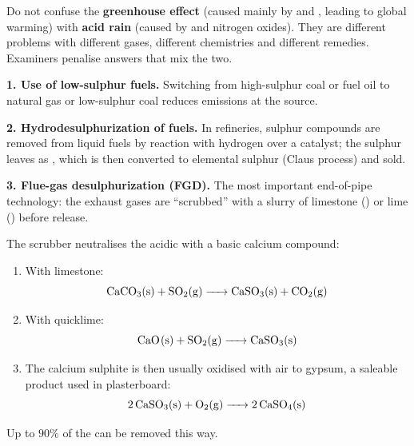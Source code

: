 \documentclass[11pt]{article}
\newcounter{popsec}
\newcounter{popsub}
\newcommand{\courssub}[1]{%
  \stepcounter{popsub}%
  \par\vspace{9pt}\noindent{\popxbold\fontsize{11.5}{13}\selectfont\color{popink}{\color{poporange}\thepopsec.\thepopsub}\hspace{6pt}#1}\par\nopagebreak\vspace{4pt}
}
\begin{document}
\begin{attention}
Do not confuse the \textbf{greenhouse effect} (caused mainly by  and , leading to global warming) with \textbf{acid rain} (caused by  and nitrogen oxides). They are different problems with different gases, different chemistries and different remedies. Examiners penalise answers that mix the two.
\end{attention}

\courssub{Control Measures}

\textbf{1. Use of low-sulphur fuels.} Switching from high-sulphur coal or fuel oil to natural gas or low-sulphur coal reduces emissions at the source.

\textbf{2. Hydrodesulphurization of fuels.} In refineries, sulphur compounds are removed from liquid fuels by reaction with hydrogen over a catalyst; the sulphur leaves as , which is then converted to elemental sulphur (Claus process) and sold.

\textbf{3. Flue-gas desulphurization (FGD).} The most important end-of-pipe technology: the exhaust gases are ``scrubbed'' with a slurry of limestone () or lime () before release.

\begin{methode}
The scrubber neutralises the acidic  with a basic calcium compound:
\begin{enumerate}
\item With limestone:
\[ \ce{CaCO3(s) + SO2(g) -> CaSO3(s) + CO2(g)} \]
\item With quicklime:
\[ \ce{CaO(s) + SO2(g) -> CaSO3(s)} \]
\item The calcium sulphite is then usually oxidised with air to gypsum, a saleable product used in plasterboard:
\[ \ce{2CaSO3(s) + O2(g) -> 2CaSO4(s)} \]
\end{enumerate}
Up to $90\%$ of the  can be removed this way.
\end{methode}
\end{document}
